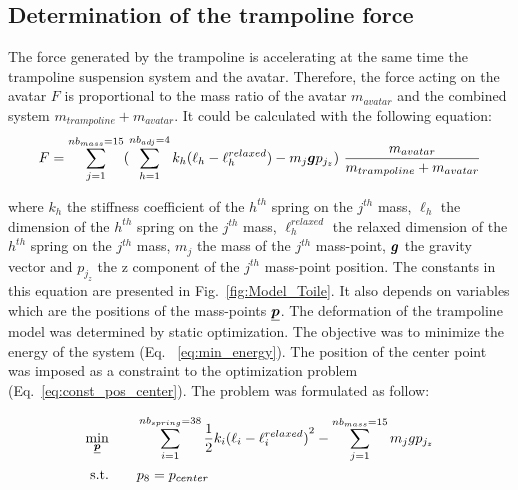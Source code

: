 \subsection{Determination of the trampoline force}\label{subsec:2c}

The force generated by the trampoline is accelerating at the same time the trampoline suspension system and the avatar.
Therefore, the force acting on the avatar $F$ is proportional to the mass ratio of the avatar $m_{avatar}$ and the combined system $m_{trampoline} + m_{avatar}$.
It could be calculated with the following equation:
\[
F = \sum_{j=1}^{nb_{mass}=15} ( \sum_{h=1}^{nb_{adj}=4} k_h {(\ell_h - {\ell}^{relaxed}_h)} - m_j \bm{g}p_{j_z}) ~ \frac{m_{avatar}}{m_{trampoline} + m_{avatar} }  \label{eq:Force_trampo}
\]

\noindent where ${k_h}$ the stiffness coefficient of the $h^{th}$ spring on the $j^{th}$ mass, $\ell_h$ the dimension of the $h^{th}$ spring on the $j^{th}$ mass, ${\ell}^{relaxed}_h$ the relaxed dimension of the $h^{th}$ spring on the $j^{th}$ mass, $m_j$ the mass of the $j^{th}$ mass-point,  $\bm{g}$ the gravity vector and $p_{j_z}$ the z component of the $j^{th}$ mass-point position.
The constants in this equation are presented in Fig.~\ref{fig:Model_Toile}.
It also depends on variables which are the positions of the mass-points $\underline{\bm{p}}$.
The deformation of the trampoline model was determined by static optimization.
The objective was to minimize the energy of the system (Eq. ~\ref{eq:min_energy}).
The position of the center point was imposed as a constraint to the optimization problem (Eq.~\ref{eq:const_pos_center}).
The problem was formulated as follow:  

\begin{subequations}
\begin{align}
 \underset{\substack{\underline{\bm{p}}}}{\min} \hspace{2em} & \sum_{i=1}^{nb_{spring}=38} \dfrac{1}{2} k_i {(\ell_i - {\ell}^{relaxed}_i)}^{2} - \sum_{j=1}^{nb_{mass}=15} m_j g p_{j_z} \label{eq:min_energy} \\ 
   \text{s.t.}  \hspace{2em}  & p_{8} = p_{center} \label{eq:const_pos_center}
\end{align}
\end{subequations}

